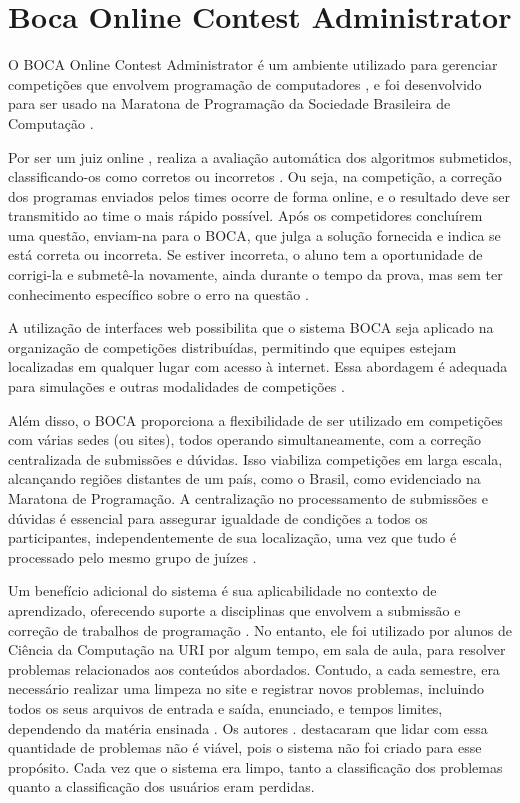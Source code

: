 \section{Boca Online Contest Administrator}

O BOCA Online Contest Administrator é um ambiente utilizado para gerenciar competições que envolvem programação de computadores \cite[p.~22]{galasso}, e foi desenvolvido para ser usado na Maratona de Programação da Sociedade Brasileira de Computação \cite[p.~2]{camposferreira}.

Por ser um juiz online \cite[p.~1]{beztonin2012}, realiza a avaliação automática dos algoritmos submetidos, classificando-os como corretos ou incorretos \cite[p.~22]{galasso}. Ou seja, na competição, a correção dos programas enviados pelos times ocorre de forma online, e o resultado deve ser transmitido ao time o mais rápido possível. Após os competidores concluírem uma questão, enviam-na para o BOCA, que julga a solução fornecida e indica se está correta ou incorreta. Se estiver incorreta, o aluno tem a oportunidade de corrigi-la e submetê-la novamente, ainda durante o tempo da prova, mas sem ter conhecimento específico sobre o erro na questão \cite[p.~4]{camposferreira}. 

A utilização de interfaces web possibilita que o sistema BOCA seja aplicado na organização de competições distribuídas, permitindo que equipes estejam localizadas em qualquer lugar com acesso à internet. Essa abordagem é adequada para simulações e outras modalidades de competições \cite[p.~20]{camposferreira}.
 
Além disso, o BOCA proporciona a flexibilidade de ser utilizado em competições com várias sedes (ou sites), todos operando simultaneamente, com a correção centralizada de submissões e dúvidas. Isso viabiliza competições em larga escala, alcançando regiões distantes de um país, como o Brasil, como evidenciado na Maratona de Programação. A centralização no processamento de submissões e dúvidas é essencial para assegurar igualdade de condições a todos os participantes, independentemente de sua localização, uma vez que tudo é processado pelo mesmo grupo de juízes \cite[p.~10-11]{camposferreira}.

Um benefício adicional do sistema é sua aplicabilidade no contexto de aprendizado, oferecendo suporte a disciplinas que envolvem a submissão e correção de trabalhos de programação \cite[p.~2]{camposferreira}. No entanto, ele foi utilizado por alunos de Ciência da Computação na URI por algum tempo, em sala de aula, para resolver problemas relacionados aos conteúdos abordados. Contudo, a cada semestre, era necessário realizar uma limpeza no site e registrar novos problemas, incluindo todos os seus arquivos de entrada e saída, enunciado, e tempos limites, dependendo da matéria ensinada \cite[p.~1]{beztonin2012}. Os autores \textcite[p.~1]{beztonin2012}. destacaram que lidar com essa quantidade de problemas não é viável, pois o sistema não foi criado para esse propósito. Cada vez que o sistema era limpo, tanto a classificação dos problemas quanto a classificação dos usuários eram perdidas.

